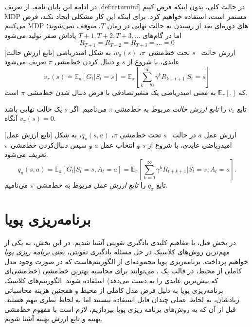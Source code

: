 در ادامه این پایان نامه، از تعریف 
\ref{def:returninf}
در حالت کلی، بدون اینکه فرض کنیم MDP مستمر است، استفاده خواهیم کرد. برای اینکه این کار مشکلی ایجاد نکند، فرض می‌کنیم MDP های دوره‌ای بعد از رسیدن به حالت نهایی در زمان $T$، متوقف نمی‌شوند؛ اما در گام‌های 
$T+1, T+2, T+3, ...$
پاداش صفر تولید می‌شود
$$R_{T+1} = R_{T+2} = R_{T+3} = ... = 0$$
[تابع ارزش حالت]
 ارزش حالت \  
  $s$
   تحت خط‌مشی\  
 $\pi$،
 $v_\pi(s)$،
  به شکل امیدریاضی عایدی، با شروع از $s$ و دنبال کردن خط‌مشی $\pi$ تعریف می‌شود
$$v_\pi(s) \doteq \mathbb{E}_\pi\left[G_t| S_t=s\right] = \mathbb{E}_\pi\left[\sum_{k=t0}^{\infty} \gamma^{k} R_{k+t+1}|S_t =s \right]$$
که $\mathbb{E}_\pi[.]$
به معنی امیدریاضی  یک متغیرتصادفی با فرض دنبال شدن خط‌مشی $\pi$ است.

تابع $v_\pi$ را 
\textit{تابع ارزش حالت} مربوط به خط‌مشی 
$\pi$
می‌نامیم. اگر $s$ یک حالت نهایی باشد آنگاه 
$v_\pi(s) = 0$.


\label{statevaluedef}

[تابع ارزش عمل]
ارزش عمل  $a$ در حالت
\ $s$
 تحت خط‌مشی 
$\pi$،
$q_\pi(s,a)$،
  به شکل امیدریاضی عایدی، با شروع از $s$ و انتخاب عمل $a$  و سپس دنبال‌کردن خط‌مشی $\pi$ تعریف می‌شود.
$$q_\pi(s,a) = \mathbb{E}_\pi\left[G_t| S_t=s, A_t=a\right] = \mathbb{E}_\pi\left[\sum_{k=0}^{\infty} \gamma^k R_{t+k+1}|S_t =s, A_t=a \right].$$
تابع $q_\pi$ را 
\textit{تابع ارزش عمل}
 مربوط به خط‌مشی 
$\pi$
می‌نامیم.
\section{برنامه‌ریزی پویا}
در بخش قبل، با مفاهیم کلیدی یادگیری تقویتی آشنا شدیم. در این بخش، به یکی از مهم‌ترین روش‌های کلاسیک در حل مسئله یادگیری تقویتی، یعنی 
\textit{برنامه ریزی پویا}
\LTRfootnote{ (DP)Dynamic Programming}خواهیم پرداخت. برنامه‌ریزی پویا
 مجموعه‌ای از الگوریتم‌هاست  که در صورت وجود مدل کاملی از محیط، در قالب یک 
\lr{MDP}،
 می‌توانند برای محاسبه بهترین خط‌مشی (خط‌مشی‌ای که بیش‌ترین عایدی را به دست می‌دهد) استفاده شوند.
الگوریتم‌های کلاسیک برنامه‌ریزی پویا به دلیل فرض
مدل کاملی از محیط و همچنین هزینه محاسباتی زیادشان، به لحاظ عملی چندان قابل استفاده نیستند اما به لحاظ نظری مهم هستند. قبل از آن که به روش‌های برنامه ریزی پویا بپردازیم، لازم است با مفهوم خط‌مشی بهینه و تابع ارزش بهینه آشنا شویم.

